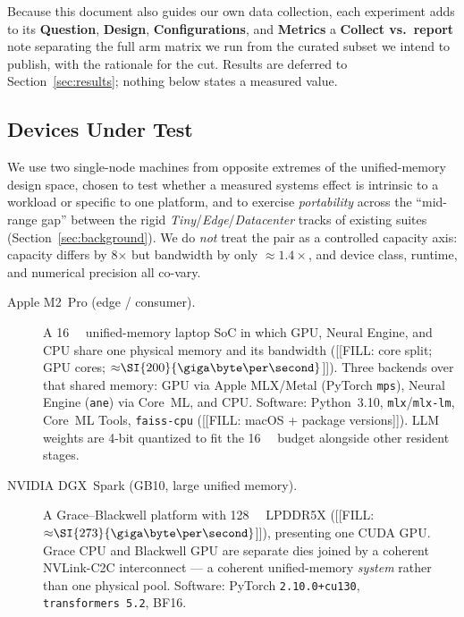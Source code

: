 Because this document also guides our own data collection, each experiment
adds to its \textbf{Question}, \textbf{Design}, \textbf{Configurations},
and \textbf{Metrics} a \textbf{Collect vs.\ report} note separating the
full arm matrix we run from the curated subset we intend to publish, with
the rationale for the cut. Results are deferred to
Section~\ref{sec:results}; nothing below states a measured value.

\subsection{Devices Under Test}
\label{sec:setup-duts}

We use two single-node machines from opposite extremes of the
unified-memory design space, chosen to test whether a measured systems
effect is intrinsic to a workload or specific to one platform, and to
exercise \emph{portability} across the ``mid-range gap'' between the rigid
\emph{Tiny}/\emph{Edge}/\emph{Datacenter} tracks of existing suites
(Section~\ref{sec:background}). We do \emph{not} treat the pair as a
controlled capacity axis: capacity differs by \num{8}$\times$ but
bandwidth by only ${\approx}\num{1.4}\times$, and device class, runtime,
and numerical precision all co-vary.

\begin{description}
  \item[Apple M2~Pro (edge / consumer).] A \SI{16}{\giga\byte}
    unified-memory laptop SoC in which GPU, Neural Engine, and CPU share
    one physical memory and its bandwidth
    ([[FILL: core split; GPU cores; ${\approx}\SI{200}{\giga\byte\per\second}$]]).
    Three backends over that shared memory: GPU via Apple MLX/Metal
    (PyTorch \texttt{mps}), Neural Engine (\texttt{ane}) via Core~ML, and
    CPU. Software: Python~3.10, \texttt{mlx}/\texttt{mlx-lm}, Core~ML
    Tools, \texttt{faiss-cpu} ([[FILL: macOS + package versions]]). LLM
    weights are 4-bit quantized to fit the \SI{16}{\giga\byte} budget
    alongside other resident stages.
  \item[NVIDIA DGX~Spark (GB10, large unified memory).] A
    Grace--Blackwell platform with \SI{128}{\giga\byte} LPDDR5X
    ([[FILL: ${\approx}\SI{273}{\giga\byte\per\second}$]]), presenting one
    CUDA GPU. Grace CPU and Blackwell GPU are separate dies joined by a
    coherent NVLink-C2C interconnect --- a coherent unified-memory
    \emph{system} rather than one physical pool. Software: PyTorch
    \texttt{2.10.0+cu130}, \texttt{transformers~5.2}, BF16.
\end{description}

